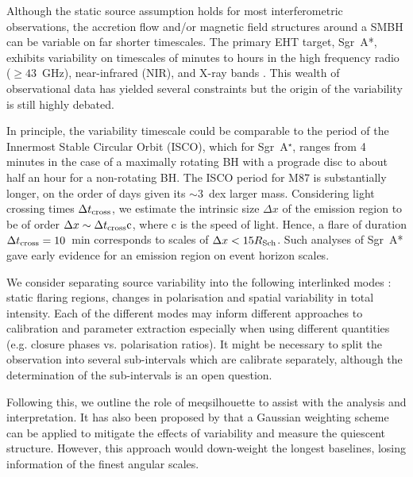 Although the static source assumption holds for most interferometric observations, the accretion flow and/or magnetic field structures around a SMBH can be variable on far shorter timescales. The primary EHT target, Sgr~A*,  exhibits variability on timescales of minutes to hours in the high frequency radio ($\ge 43$~GHz), near-infrared (NIR), and X-ray bands \citep[e.g.][]{Baganoff_2001, Genzel_2003, Yusef-Zadeh_2006,Marrone_2006, Fish_2011, Johnson_2015b}. This wealth of observational data has yielded several constraints but the origin of the variability is still highly debated.


In principle, the variability timescale could be comparable to the period of the Innermost Stable Circular Orbit (ISCO), which for Sgr~A$^\star$, ranges from 4 minutes in the case of a maximally rotating BH with a prograde disc to about half an hour for a non-rotating BH. The ISCO period for M87 is substantially longer, on the order of days given its $\sim3$~dex larger mass. Considering light crossing times $\Delta t_{\rm cross}$, we estimate the intrinsic size $\Delta x$ of the emission region to be of order $\Delta x \sim \Delta t_{\rm cross} \rm c$, where c is the speed of light. Hence, a flare of duration $ \Delta t_{\rm cross} =10$~min corresponds to scales of  $\Delta x < 15 R_{\rm Sch}$. Such analyses of Sgr~A* gave early evidence for an emission region on event horizon scales.


We consider separating source variability into the following interlinked modes : static flaring regions, changes in polarisation and spatial variability in total intensity. Each of the different modes may inform different approaches to calibration and parameter extraction especially when using different quantities (e.g. closure phases vs. polarisation ratios). It might be necessary to split the observation into several sub-intervals which are calibrate separately, although the determination of the sub-intervals is an open question.

Following this, we outline the role of {\sc meqsilhouette} to assist with the analysis and interpretation. It has also been proposed by \citet{Lu_2016} that a Gaussian weighting scheme can be applied to mitigate the effects of variability and measure the quiescent structure. However, this approach would down-weight the longest baselines, losing information of the finest angular scales.



